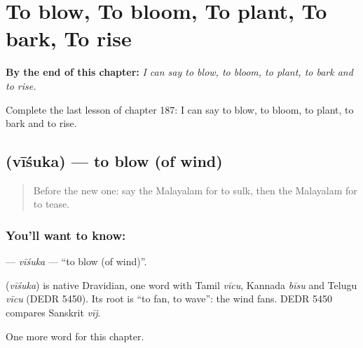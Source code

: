 
\chapter{To blow, To bloom, To plant, To bark, To rise}
\label{ch:ml-to-blow-to-bloom-to-plant-to-bark-to-rise}

\begin{chapteropening}
\textbf{By the end of this chapter:} \emph{I can say to blow, to bloom, to plant, to bark and to rise.}

Complete the last lesson of chapter 187: I can say to blow, to bloom, to plant, to bark and to rise.
\end{chapteropening}

\section[\texorpdfstring{\ml{വീശുക} (vīśuka)}{വീശുക (vīśuka)}]{ (vīśuka) — to blow (of wind)}

\label{lesson:ML-C187-visuka}



\begin{quote}
Before the new one: say the Malayalam for to sulk, then the Malayalam for to tease.
\end{quote}

\subsection*{You'll want to know: }
\textbf{} — \emph{vīśuka} — \textquotedblleft{}to blow (of wind)\textquotedblright{}.

\begin{cousinweb}
\textbf{} (\emph{vīśuka}) is native Dravidian, one word with Tamil \emph{vīcu}, Kannada \emph{bīsu} and Telugu \emph{vīcu} (DEDR 5450). Its root is \textquotedblleft{}to fan, to wave\textquotedblright{}: the wind fans. DEDR 5450 compares Sanskrit \emph{vīj}.
\end{cousinweb}

\begin{grammarlens}[title={What you've built}]
One more word for this chapter.
\end{grammarlens}

